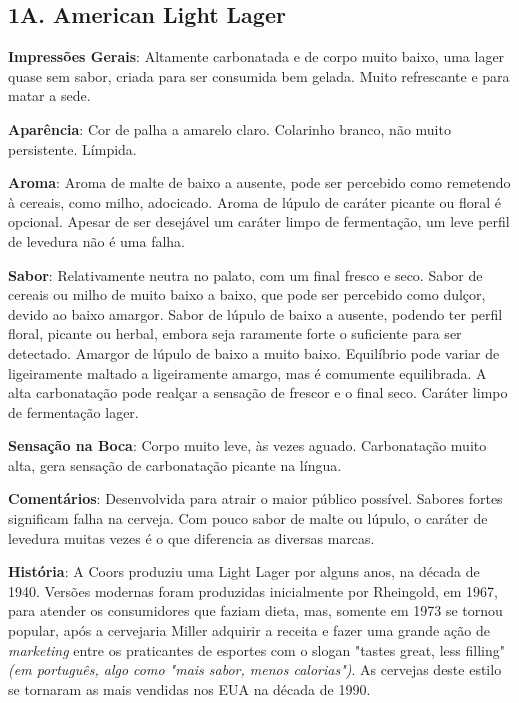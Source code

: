\subsection*{1A. American Light Lager}

\textbf{Impressões Gerais}: Altamente carbonatada e de corpo muito baixo, uma lager quase sem sabor, criada para ser consumida bem gelada. Muito refrescante e para matar a sede.

\textbf{Aparência}: Cor de palha a amarelo claro. Colarinho branco, não muito persistente. Límpida.

\textbf{Aroma}: Aroma de malte de baixo a ausente, pode ser percebido como remetendo à cereais, como milho, adocicado. Aroma de lúpulo de caráter picante ou floral é opcional. Apesar de ser desejável um caráter limpo de fermentação, um leve perfil de levedura não é uma falha.

\textbf{Sabor}: Relativamente neutra no palato, com um final fresco e seco. Sabor de cereais ou milho de muito baixo a baixo, que pode ser percebido como dulçor, devido ao baixo amargor. Sabor de lúpulo de baixo a ausente, podendo ter perfil floral, picante ou herbal, embora seja raramente forte o suficiente para ser detectado. Amargor de lúpulo de baixo a muito baixo. Equilíbrio pode variar de ligeiramente maltado a ligeiramente amargo, mas é comumente equilibrada. A alta carbonatação pode realçar a sensação de frescor e o final seco. Caráter limpo de fermentação lager.

\textbf{Sensação na Boca}: Corpo muito leve, às vezes aguado. Carbonatação muito alta, gera sensação de carbonatação picante na língua.

\textbf{Comentários}: Desenvolvida para atrair o maior público possível. Sabores fortes significam falha na cerveja. Com pouco sabor de malte ou lúpulo, o caráter de levedura muitas vezes é o que diferencia as diversas marcas.

\textbf{História}: A Coors produziu uma Light Lager por alguns anos, na década de 1940. Versões modernas foram produzidas inicialmente por Rheingold, em 1967, para atender os consumidores que faziam dieta, mas, somente em 1973 se tornou popular, após a cervejaria Miller adquirir a receita e fazer uma grande ação de \textit{marketing} entre os praticantes de esportes com o slogan "tastes great, less filling" \textit{(em português, algo como "mais sabor, menos calorias")}. As cervejas deste estilo se tornaram as mais vendidas nos EUA na década de 1990.

